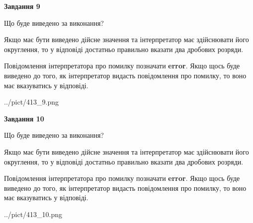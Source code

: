 \documentclass[12pt, ukrainian]{article}
\begin{document}
{\begin {Large}
{\begin {center}\textbf{Завдання 9}\end {center}}\par
Що буде виведено за виконання? \par

Якщо має бути виведено дійсне значення та інтерпретатор має здійснювати його округлення, 
то у відповіді достатньо правильно вказати два дробових розряди.

Повідомлення інтерпретатора про помилку позначати \textbf{error}.
Якщо щось буде виведено до того, як інтерпретатор видасть повідомлення про помилку, 
то воно має вказуватись у відповіді. \par

\begin{center}
	{../pict/413_9.png}
\end{center}
\newpage

{\begin {center}\textbf{Завдання 10}\end {center}}\par
Що буде виведено за виконання? \par

Якщо має бути виведено дійсне значення та інтерпретатор має здійснювати його округлення, 
то у відповіді достатньо правильно вказати два дробових розряди.

Повідомлення інтерпретатора про помилку позначати \textbf{error}.
Якщо щось буде виведено до того, як інтерпретатор видасть повідомлення про помилку, 
то воно має вказуватись у відповіді. \par

\begin{center}
	{../pict/413_10.png}
\end{center}
\newpage

\end {Large}}
\end{document}
